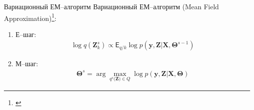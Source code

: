 \documentclass[9pt,pdf,hyperref={unicode}]{beamer}
\begin{document}
\begin{frame}{Вариационный ЕМ--алгоритм}
	Вариационный ЕМ--алгоритм (Mean Field Approximation)\footnote{\url{}}:
	\begin{enumerate}
		\item Е--шаг: 
			\begin{equation}
			\label{sl:5}
				\begin{aligned}
					\log q\left(\textbf{Z}_{k}^{s}\right) \propto \mathsf{E}_{q/k}\log p\left(\textbf{y}, \textbf{Z}|\textbf{X},\bm{\Theta}^{s-1}\right)
				\end{aligned}
			\end{equation}
		\item М--шаг: 
			\begin{equation}
			\label{sl:6}
				\begin{aligned}
					\bm{\Theta}^{s} = \arg\max_{q^s\bigr(\textbf{Z}\bigr)\in Q} \log p\left(\textbf{y}, \textbf{Z}|\textbf{X},\bm{\Theta}\right)
				\end{aligned}
			\end{equation}
	\end{enumerate}

\end{frame}
\end{document}
